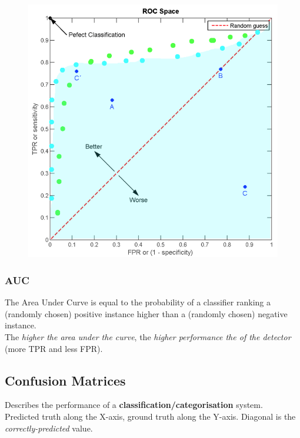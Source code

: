\documentclass[english, 10pt]{article}
\begin{document}
\begin{figure}[ht!]      
	\centering 
	\includegraphics[scale=0.3]{roc.png}
\end{figure}

\subsubsection{AUC}

The Area Under Curve is equal to the probability of a classifier ranking a (randomly chosen) positive instance higher than a (randomly chosen) negative instance. \\

The \textit{higher the area under the curve}, the \textit{higher performance the of the detector} (more TPR and less FPR).

\subsection{Confusion Matrices}

Describes the performance of a \textbf{classification/categorisation} system. \\

Predicted truth along the X-axis, ground truth along the Y-axis. Diagonal is the \textit{correctly-predicted} value.
\end{document}
